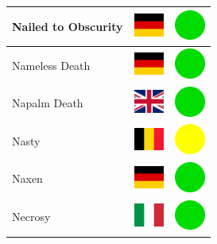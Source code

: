 \documentclass[12pt, a4paper, twoside]{report}
\begin{document}
\begin{center}
\begin{longtable}{|p{5cm}|p{2cm}|p{2cm}|}
Nailed to Obscurity & \includegraphics[width=1cm]{4x3/de} & \includegraphics[width=1cm]{likes/y} \\ \hline
Nameless Death & \includegraphics[width=1cm]{4x3/de} & \includegraphics[width=1cm]{likes/y} \\ \hline
Napalm Death & \includegraphics[width=1cm]{4x3/gb} & \includegraphics[width=1cm]{likes/y} \\ \hline
Nasty & \includegraphics[width=1cm]{4x3/be} & \includegraphics[width=1cm]{likes/m} \\ \hline
Naxen & \includegraphics[width=1cm]{4x3/de} & \includegraphics[width=1cm]{likes/y} \\ \hline
Necrosy & \includegraphics[width=1cm]{4x3/it} & \includegraphics[width=1cm]{likes/y} \\ \hline

\end{longtable}
\end{center}
\end{document}
